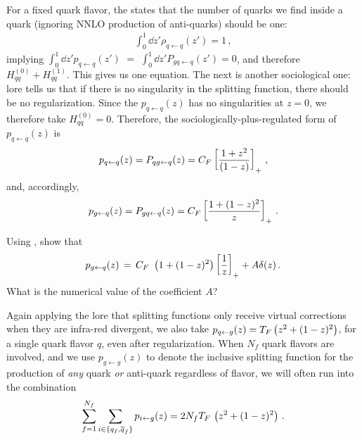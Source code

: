 \begin{example}
    \label{ex:p_qq-baryon-number}

    For a fixed quark flavor, the  states that the number of quarks we find inside a quark (ignoring NNLO production of anti-quarks) should be one:
    \begin{align}
        \int_0^1 \dd z'
        \rho_{q \leftarrow q}(z')
        = 1
        \,,
    \end{align}
    implying \(\int_0^1 \dd z' p_{q\leftarrow q}(z') \,\, =\,\, \int_0^1 \dd z' P_{gq \leftarrow q}(z') = 0\), and therefore \(H^{(0)}_{qq} + H^{(1)}_{qq}\).
    This gives us one equation.
    The next is another sociological one:
    lore tells us that if there is no singularity in the splitting function, there should be no regularization.
    Since the \(p_{q\leftarrow q}(z)\) has no singularities at \(z = 0\), we therefore take \(H^{(0)}_{qq} = 0\).
    Therefore, the sociologically-plus-regulated form of \(p_{q\leftarrow q}(z)\) is
    \begin{align}
        p_{q \leftarrow q}(z)
        =
        P_{qg \leftarrow q}(z)
        =
        C_F \left[\frac{1 + z^2}{(1-z)}\right]_+
        \,,
    \end{align}
    and, accordingly,
    \begin{align}
        p_{g \leftarrow q}(z)
        =
        P_{gq \leftarrow q}(z)
        =
        C_F \left[\frac{1 + (1-z)^2}{z}\right]_+
        \,.
    \end{align}
\end{example}

\begin{exercise}
    Using , show that
    \begin{align}
        p_{g \leftarrow q}(z)
        \,
        =
        \,
        C_F
        \,\,
        \left(1+(1-z)^2\right)
        \left[\frac{1}{z}\right]_+
        +
        A \delta(z)
        \,.
    \end{align}
    What is the numerical value of the coefficient \(A\)?
\end{exercise}


Again applying the lore that splitting functions only receive virtual corrections when they are infra-red divergent, we also take \(p_{q \leftarrow g}(z) = T_F \left(z^2 + (1-z)^2\right)\), for a single quark flavor \(q\), even after regularization.
%
When \(N_f\) quark flavors are involved, and we use \(p_{g \leftarrow g}(z)\) to denote the inclusive splitting function for the production of \emph{any} quark \emph{or} anti-quark regardless of flavor, we will often run into the combination
\begin{align}
    \sum_{f=1}^{N_f}
    \sum_{i \in \{q_f, \overline{q}_f\}}
    p_{i \leftarrow g}(z)
    =
    2 N_f T_F \, \left(z^2 + (1-z)^2\right)
    \,.
\end{align}


